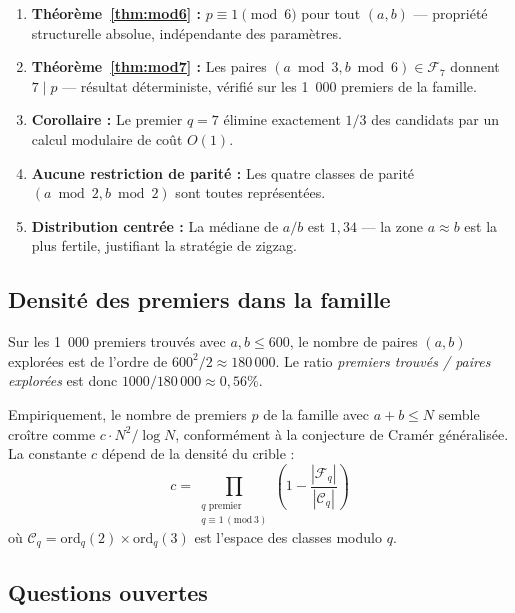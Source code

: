 \documentclass[12pt,a4paper]{article}
\theoremstyle{definition}
\newcommand{\ord}{\mathrm{ord}}
\begin{document}
\begin{enumerate}
  \item \textbf{Théorème~\ref{thm:mod6} :}
    $p \equiv 1 \pmod{6}$ pour tout $(a,b)$ —
    propriété structurelle absolue, indépendante des paramètres.

  \item \textbf{Théorème~\ref{thm:mod7} :}
    Les paires $(a \bmod 3, b \bmod 6) \in \mathcal{F}_7$
    donnent $7 \mid p$ — résultat déterministe,
    vérifié sur les 1~000 premiers de la famille.

  \item \textbf{Corollaire :}
    Le premier $q = 7$ élimine exactement $1/3$ des candidats
    par un calcul modulaire de coût $O(1)$.

  \item \textbf{Aucune restriction de parité :}
    Les quatre classes de parité $(a \bmod 2, b \bmod 2)$
    sont toutes représentées.

  \item \textbf{Distribution centrée :}
    La médiane de $a/b$ est $1{,}34$ — la zone $a \approx b$
    est la plus fertile, justifiant la stratégie de zigzag.
\end{enumerate}

\subsection{Densité des premiers dans la famille}

Sur les 1~000 premiers trouvés avec $a, b \leq 600$,
le nombre de paires $(a,b)$ explorées est de l'ordre de $600^2/2 \approx 180\,000$.
Le ratio \emph{premiers trouvés / paires explorées} est donc
$1000 / 180\,000 \approx 0{,}56\%$.

Empiriquement, le nombre de premiers $p$ de la famille
avec $a + b \leq N$ semble croître comme $c \cdot N^2 / \log N$,
conformément à la conjecture de Cramér généralisée.
La constante $c$ dépend de la densité du crible :
\[
  c = \prod_{\substack{q \text{ premier} \\ q \equiv 1\,(\text{mod}\,3)}}
  \left(1 - \frac{|\mathcal{F}_q|}{|\mathcal{C}_q|}\right)
\]
où $\mathcal{C}_q = \ord_q(2) \times \ord_q(3)$ est l'espace des classes modulo $q$.

\subsection{Questions ouvertes}
\end{document}
